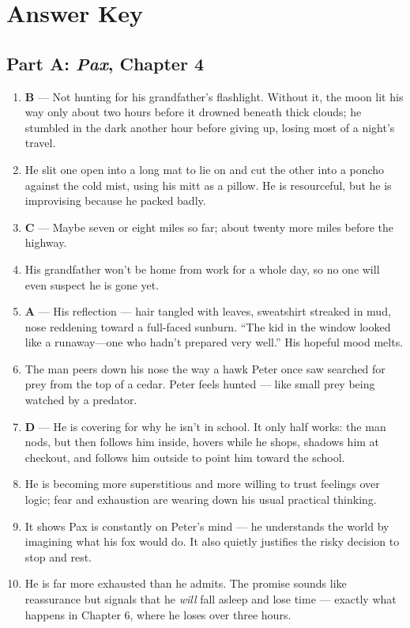 \documentclass[11pt]{article}
\begin{document}
\newpage
\section*{Answer Key}

\subsection*{Part A: \textit{Pax}, Chapter 4}
\begin{enumerate}
  \item \textbf{B} --- Not hunting for his grandfather's flashlight. Without it, the moon lit his way only about two hours before it drowned beneath thick clouds; he stumbled in the dark another hour before giving up, losing most of a night's travel.
  \item He slit one open into a long mat to lie on and cut the other into a poncho against the cold mist, using his mitt as a pillow. He is resourceful, but he is improvising because he packed badly.
  \item \textbf{C} --- Maybe seven or eight miles so far; about twenty more miles before the highway.
  \item His grandfather won't be home from work for a whole day, so no one will even suspect he is gone yet.
  \item \textbf{A} --- His reflection --- hair tangled with leaves, sweatshirt streaked in mud, nose reddening toward a full-faced sunburn. ``The kid in the window looked like a runaway---one who hadn't prepared very well.'' His hopeful mood melts.
  \item The man peers down his nose the way a hawk Peter once saw searched for prey from the top of a cedar. Peter feels hunted --- like small prey being watched by a predator.
  \item \textbf{D} --- He is covering for why he isn't in school. It only half works: the man nods, but then follows him inside, hovers while he shops, shadows him at checkout, and follows him outside to point him toward the school.
  \item He is becoming more superstitious and more willing to trust feelings over logic; fear and exhaustion are wearing down his usual practical thinking.
  \item It shows Pax is constantly on Peter's mind --- he understands the world by imagining what his fox would do. It also quietly justifies the risky decision to stop and rest.
  \item He is far more exhausted than he admits. The promise sounds like reassurance but signals that he \textit{will} fall asleep and lose time --- exactly what happens in Chapter 6, where he loses over three hours.
\end{enumerate}
\end{document}
